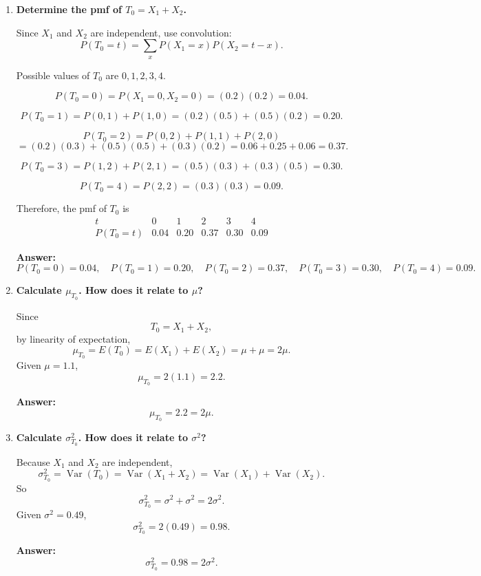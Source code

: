 \documentclass[11pt]{article}
\begin{document}
\begin{enumerate}
    \item[(a)] \textbf{Determine the pmf of $T_0=X_1+X_2$.}

    Since $X_1$ and $X_2$ are independent, use convolution:
    \[
    P(T_0=t)=\sum_x P(X_1=x)P(X_2=t-x).
    \]

    Possible values of $T_0$ are $0,1,2,3,4$.

    \[
    P(T_0=0)=P(X_1=0,X_2=0)=(0.2)(0.2)=0.04.
    \]

    \[
    P(T_0=1)=P(0,1)+P(1,0)=(0.2)(0.5)+(0.5)(0.2)=0.20.
    \]

    \[
    P(T_0=2)=P(0,2)+P(1,1)+P(2,0)
    \]
    \[
    =(0.2)(0.3)+(0.5)(0.5)+(0.3)(0.2)=0.06+0.25+0.06=0.37.
    \]

    \[
    P(T_0=3)=P(1,2)+P(2,1)=(0.5)(0.3)+(0.3)(0.5)=0.30.
    \]

    \[
    P(T_0=4)=P(2,2)=(0.3)(0.3)=0.09.
    \]

    Therefore, the pmf of $T_0$ is
    \[
    \begin{array}{c|ccccc}
    t & 0 & 1 & 2 & 3 & 4\\
    \hline
    P(T_0=t) & 0.04 & 0.20 & 0.37 & 0.30 & 0.09
    \end{array}
    \]

    \textbf{Answer:}
    \[
    P(T_0=0)=0.04,\quad P(T_0=1)=0.20,\quad P(T_0=2)=0.37,\quad P(T_0=3)=0.30,\quad P(T_0=4)=0.09.
    \]

    \item[(b)] \textbf{Calculate $\mu_{T_0}$. How does it relate to $\mu$?}

    Since
    \[
    T_0=X_1+X_2,
    \]
    by linearity of expectation,
    \[
    \mu_{T_0}=E(T_0)=E(X_1)+E(X_2)=\mu+\mu=2\mu.
    \]
    Given $\mu=1.1$,
    \[
    \mu_{T_0}=2(1.1)=2.2.
    \]

    \textbf{Answer:}
    \[
    \mu_{T_0}=2.2=2\mu.
    \]

    \item[(c)] \textbf{Calculate $\sigma^2_{T_0}$. How does it relate to $\sigma^2$?}

    Because $X_1$ and $X_2$ are independent,
    \[
    \sigma^2_{T_0}=\operatorname{Var}(T_0)=\operatorname{Var}(X_1+X_2)
    =\operatorname{Var}(X_1)+\operatorname{Var}(X_2).
    \]
    So
    \[
    \sigma^2_{T_0}=\sigma^2+\sigma^2=2\sigma^2.
    \]
    Given $\sigma^2=0.49$,
    \[
    \sigma^2_{T_0}=2(0.49)=0.98.
    \]

    \textbf{Answer:}
    \[
    \sigma^2_{T_0}=0.98=2\sigma^2.
    \]
\end{enumerate}
\end{document}
